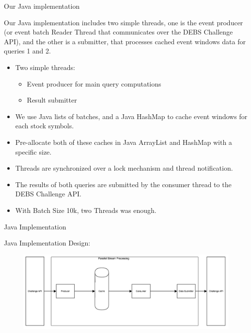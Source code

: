 \documentclass[9pt]{beamer}
\begin{document}


\begin{frame}[fragile]{Our Java implementation }
    
    Our Java implementation includes two simple threads, one is the event producer (or event batch Reader Thread that communicates over the DEBS Challenge API), and the other is a submitter, that processes cached event windows data for queries 1 and 2. 
    \begin{itemize}
        \item Two simple threads:
        \begin{itemize}
            \item Event producer for main query computations
            \item Result submitter
        \end{itemize}
        \item We use Java lists of batches, and a Java HashMap to cache event windows for each stock symbols. 
        \item Pre-allocate both of these caches in Java ArrayList and HashMap with a specific size.
        \item Threads are synchronized over a lock mechanism and thread notification.
        \item The results of both queries are submitted by the consumer thread to the DEBS Challenge API.
        \item With Batch Size 10k, two Threads was enough. 
    \end{itemize}


    
\end{frame}





\begin{frame}[fragile]{ Java Implementation }


    Java Implementation Design:  

    \begin{figure}
        \begin{center}
            \includegraphics[width=1\textwidth]{./debs_java_v2.png}
        \end{center}
    \end{figure}
   

    
\end{frame}
\end{document}
